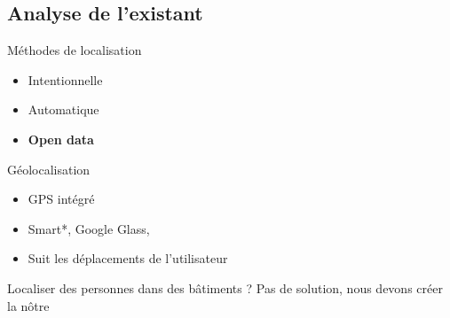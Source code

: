 \documentclass{beamer} %
\begin{document}
  \subsection{Analyse de l'existant}
  \begin{frame}{\subsecname}
    \begin{block}{Méthodes de localisation}
      \begin{itemize}
        \item Intentionnelle
        \item Automatique
        \item \textbf{Open data}
      \end{itemize}  
    \end{block}
    
    \begin{block}{Géolocalisation}
      \begin{itemize}
        \item GPS intégré
        \item Smart*, Google Glass, 
        \item Suit les déplacements de l'utilisateur
      \end{itemize}
    \end{block}

    \pause

    \begin{alertblock}{Localiser des personnes dans des bâtiments ?}
      Pas de solution, nous devons créer la nôtre
    \end{alertblock}
    
  \end{frame}
\end{document}
